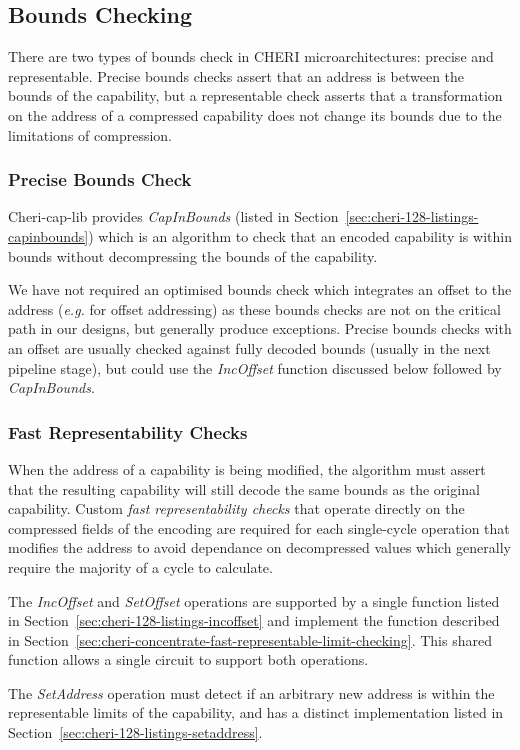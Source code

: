 \subsection{Bounds Checking}
There are two types of bounds check in CHERI microarchitectures: precise and representable.
Precise bounds checks assert that an address is between the bounds of the capability,
but a representable check asserts that a transformation on the address of a compressed capability
does not change its bounds due to the limitations of compression.
\subsubsection{Precise Bounds Check}
Cheri-cap-lib provides \emph{CapInBounds} (listed in Section~\ref{sec:cheri-128-listings-capinbounds}) which is an algorithm to check that an encoded capability is within bounds without
decompressing the bounds of the capability.

We have not required an optimised bounds check which integrates an offset to the address (\textit{e.g.} for offset addressing) as these
bounds checks are not on the critical path in our designs, but generally produce exceptions.
Precise bounds checks with an offset are usually checked against fully decoded bounds (usually in the next pipeline stage),
but could use the \emph{IncOffset} function discussed below followed by \emph{CapInBounds}.

\subsubsection{Fast Representability Checks}
When the address of a capability is being modified, the algorithm must assert that the resulting capability will still decode the same bounds as the original capability.
Custom \emph{fast representability checks} that operate directly on the compressed fields of the encoding are required for each single-cycle operation that modifies the address to avoid dependance on decompressed values which generally require the majority of a cycle to calculate.

The \emph{IncOffset} and \emph{SetOffset} operations are supported by a single function listed in Section~\ref{sec:cheri-128-listings-incoffset} and implement the function described in Section~\ref{sec:cheri-concentrate-fast-representable-limit-checking}.
This shared function allows a single circuit to support both operations.

The \emph{SetAddress} operation must detect if an arbitrary new address is within the representable limits of the capability, and has a distinct implementation listed in Section~\ref{sec:cheri-128-listings-setaddress}.

